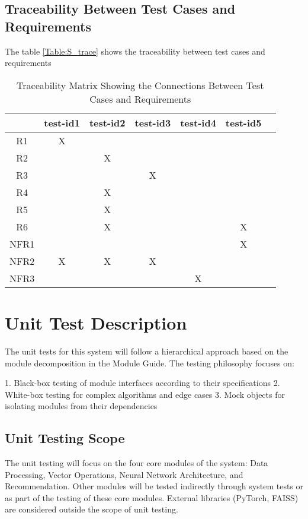 \documentclass[12pt, titlepage]{article}
\begin{document}
\subsection{Traceability Between Test Cases and Requirements}

The table \ref{Table:S_trace}
 shows the traceability between test cases and requirements

\begin{table}[h!]\label{Table:S_trace}
  \centering
  \begin{tabular}{|c|c|c|c|c|c|c|}
  \hline
    & test-id1& test-id2& test-id3&test-id4&test-id5 \\
  \hline
  R1        & X&  & & &  \\ \hline
  R2        & & X& & &  \\ \hline
  R3        & & & X& & \\ \hline
  R4        & & X& & & \\ \hline
  R5        & &X & & & \\ \hline
  R6        & &X & & & X\\ \hline
  NFR1      & & & & &  X\\ \hline
  NFR2      &X & X& X& & \\ \hline
  NFR3      & & & &X & \\ \hline
  \end{tabular}
  \caption{Traceability Matrix Showing the Connections Between Test Cases and Requirements}
  \label{Table:A_trace}
  \end{table}

\section{Unit Test Description}\label{UnitTest}

The unit tests for this system will follow a hierarchical approach based on the module decomposition in the Module Guide. The testing philosophy focuses on:

1. Black-box testing of module interfaces according to their specifications
2. White-box testing for complex algorithms and edge cases
3. Mock objects for isolating modules from their dependencies

\subsection{Unit Testing Scope}

The unit testing will focus on the four core modules of the system: Data Processing, Vector Operations, Neural Network Architecture, and Recommendation. Other modules will be tested indirectly through system tests or as part of the testing of these core modules. External libraries (PyTorch, FAISS) are considered outside the scope of unit testing.
\end{document}
